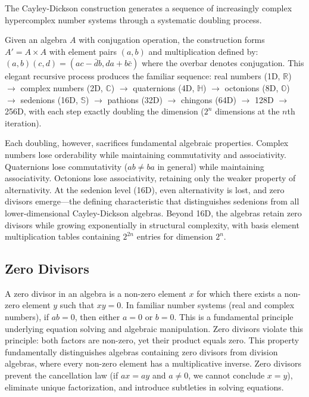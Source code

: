 \documentclass[11pt]{article}
\begin{document}
The Cayley-Dickson construction generates a sequence of increasingly complex hypercomplex number systems through a systematic doubling process.

Given an algebra $A$ with conjugation operation, the construction forms $A' = A \times A$ with element pairs $(a,b)$ and multiplication defined by: $(a,b)(c,d) = (ac - \bar{d}b, da + b\bar{c})$ where the overbar denotes conjugation. This elegant recursive process produces the familiar sequence: real numbers (1D, $\mathbb{R}$) $\rightarrow$ complex numbers (2D, $\mathbb{C}$) $\rightarrow$ quaternions (4D, $\mathbb{H}$) $\rightarrow$ octonions (8D, $\mathbb{O}$) $\rightarrow$ sedenions (16D, $\mathbb{S}$) $\rightarrow$ pathions (32D) $\rightarrow$ chingons (64D) $\rightarrow$ 128D $\rightarrow$ 256D, with each step exactly doubling the dimension ($2^n$ dimensions at the $n$th iteration).

Each doubling, however, sacrifices fundamental algebraic properties. Complex numbers lose orderability while maintaining commutativity and associativity. Quaternions lose commutativity ($ab \neq ba$ in general) while maintaining associativity. Octonions lose associativity, retaining only the weaker property of alternativity. At the sedenion level (16D), even alternativity is lost, and zero divisors emerge---the defining characteristic that distinguishes sedenions from all lower-dimensional Cayley-Dickson algebras. Beyond 16D, the algebras retain zero divisors while growing exponentially in structural complexity, with basis element multiplication tables containing $2^{2n}$ entries for dimension $2^n$.

\subsection{Zero Divisors}

A zero divisor in an algebra is a non-zero element $x$ for which there exists a non-zero element $y$ such that $xy = 0$. In familiar number systems (real and complex numbers), if $ab = 0$, then either $a = 0$ or $b = 0$. This is a fundamental principle underlying equation solving and algebraic manipulation. Zero divisors violate this principle: both factors are non-zero, yet their product equals zero. This property fundamentally distinguishes algebras containing zero divisors from division algebras, where every non-zero element has a multiplicative inverse. Zero divisors prevent the cancellation law (if $ax = ay$ and $a \neq 0$, we cannot conclude $x = y$), eliminate unique factorization, and introduce subtleties in solving equations.
\end{document}
